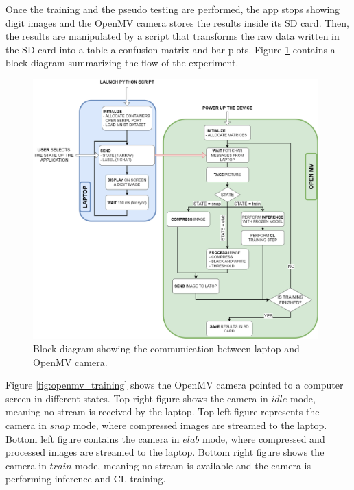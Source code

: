 \documentclass[12pt]{report}
\begin{document}
Once the training and the pseudo testing are performed, the app stops showing digit images and the OpenMV camera stores the results inside its SD card. Then, the results are manipulated by a script that transforms the raw data written in the SD card into a table a confusion matrix and bar plots. Figure \ref{fig:python_openmv_diagram} contains a block diagram summarizing the flow of the experiment. 

\begin{figure}[h!]
    \centering
    \includegraphics[width=110mm]{Figures/Chapter4/python_openmv.png} 
    \caption{Block diagram showing the communication between laptop and OpenMV camera.}
    \label{fig:python_openmv_diagram}    
\end{figure}

Figure \ref{fig:openmv_training} shows the OpenMV camera pointed to a computer screen in different states. Top right figure shows the camera in $idle$ mode, meaning no stream is received by the laptop. Top left figure represents the camera in $snap$ mode, where compressed images are streamed to the laptop. Bottom left figure contains the camera in $elab$ mode, where compressed and processed images are streamed to the laptop. Bottom right figure shows the camera in $train$ mode, meaning no stream is available and the camera is performing inference and CL training.
\end{document}
